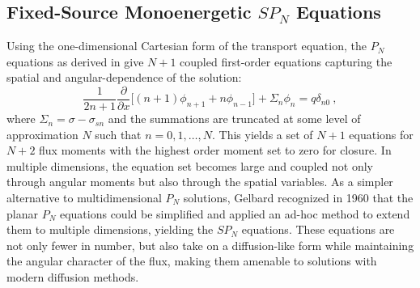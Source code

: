 \subsection{Fixed-Source Monoenergetic $SP_N$ Equations}
\label{subsec:fixed_source_spn}
Using the one-dimensional Cartesian form of the transport equation,
the $P_N$ equations as derived in \cite{lewis_computational_1993} give
$N+1$ coupled first-order equations capturing the spatial and
angular-dependence of the solution:
\begin{equation}
   \frac{1}{2n+1} \frac{\partial}{\partial x}\Big[ (n+1) \phi_{n+1} + n
     \phi_{n-1} \Big] + \Sigma_n \phi_n = q\delta_{n0} \:,
  \label{eq:final_pn_equations}
\end{equation}
where $\Sigma_n = \sigma-\sigma_{sn}$ and the summations are truncated
at some level of approximation $N$ such that $n = 0,1,\dotsc,N$. This
yields a set of $N+1$ equations for $N+2$ flux moments with the
highest order moment set to zero for closure. In multiple dimensions,
the equation set becomes large and coupled not only through angular
moments but also through the spatial variables. As a simpler
alternative to multidimensional $P_N$ solutions, Gelbard recognized in
1960 that the planar $P_N$ equations could be simplified and applied
an ad-hoc method to extend them to multiple dimensions, yielding the
$SP_N$ equations. These equations are not only fewer in number, but
also take on a diffusion-like form while maintaining the angular
character of the flux, making them amenable to solutions with modern
diffusion methods.

